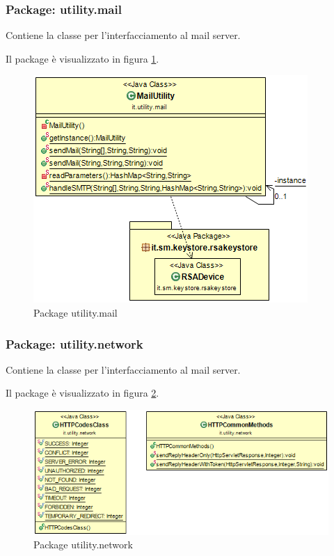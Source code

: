 \subsubsection{Package: \textbf{utility.mail}}

Contiene la classe per l’interfacciamento al mail server.

Il package è visualizzato in figura \ref{gfx:dependencies_utilitymail}.

\begin{figure}[!htbp]
	\centering
	\includegraphics[scale = .5]{img/dependencies_utility_mail}
	\caption{Package utility.mail}
	\label{gfx:dependencies_utilitymail}
\end{figure}

\subsubsection{Package: \textbf{utility.network}}

Contiene la classe per l’interfacciamento al mail server.

Il package è visualizzato in figura \ref{gfx:dependencies_utility_network}.

\begin{figure}[!htbp]
	\centering
	\includegraphics[scale = .5]{img/dependencies_utility_network}
	\caption{Package utility.network}
	\label{gfx:dependencies_utility_network}
\end{figure}

